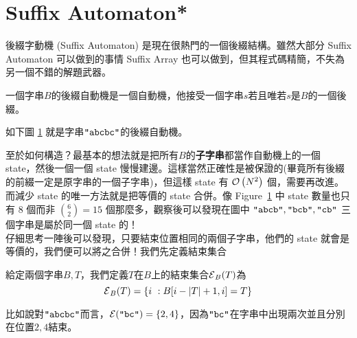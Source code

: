 \documentclass[a4paper,12pt]{book}
\begin{document}
\section{Suffix Automaton*}
後綴字動機 (Suffix Automaton) 是現在很熱門的一個後綴結構。雖然大部分 Suffix Automaton 可以做到的事情 Suffix Array 也可以做到，但其程式碼精簡，不失為另一個不錯的解題武器。

\begin{theorem}[定義]
  一個字串$B$的後綴自動機是一個自動機，他接受一個字串$s$若且唯若$s$是$B$的一個後綴。
\end{theorem}
如下圖 \ref{fig:sam1} 就是字串$\texttt{"abcbc"}$的後綴自動機。
\begin{figure}[H]
  \centering
\caption{}
\label{fig:sam1}
\end{figure}
至於如何構造？最基本的想法就是把所有$B$的{\bf 子字串}都當作自動機上的一個 state，然後一個一個 state 慢慢建邊。這樣當然正確性是被保證的(畢竟所有後綴的前綴一定是原字串的一個子字串)，但這樣 state 有 $\operatorname{\mathcal{O}}\left(N^2\right)$ 個，需要再改進。\\
而減少 state 的唯一方法就是把等價的 state 合併。像 Figure~\ref{fig:sam1} 中 state 數量也只有 $8$ 個而非 ${6 \choose 2} = 15$ 個那麼多，觀察後可以發現在圖中 $\texttt{"abcb"},\texttt{"bcb"},\texttt{"cb"}$ 三個字串是屬於同一個 state 的！\\
仔細思考一陣後可以發現，只要結束位置相同的兩個子字串，他們的 state 就會是等價的，我們便可以將之合併！我們先定義結束集合

\begin{theorem}[定義]
  給定兩個字串$B, T$，我們定義$T$在$B$上的結束集合$\operatorname{\mathcal{E}}_B(T)$為
  \[
    \operatorname{\mathcal{E}}_B(T) = \{ i ~:  B[ i - \lvert T \rvert + 1 , i ] = T \}
  \]
\end{theorem}
比如說對$\texttt{"abcbc"}$而言，$\operatorname{\mathcal{E}}(\texttt{"bc"}) = \{2, 4\}$，因為$\texttt{"bc"}$在字串中出現兩次並且分別在位置$2, 4$結束。
\end{document}
